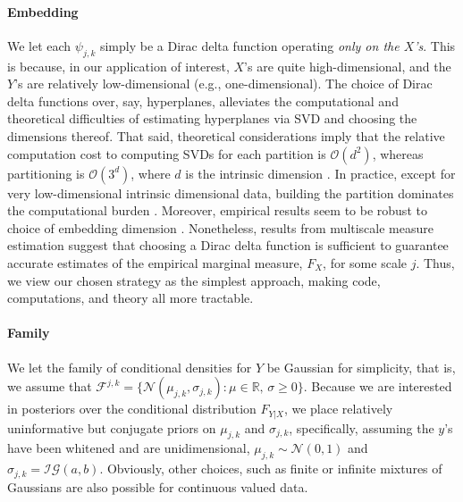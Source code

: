 \documentclass{article} %
\newcommand{\Real}{\mathbb{R}}
\providecommand{\mc}[1]{\mathcal{#1}}
\begin{document}
\paragraph{Embedding} We let each $\psi_{j,k}$ simply be a Dirac delta function operating \emph{only on the $X$'s}.  This is because, in our application of interest, $X$'s are quite high-dimensional, and the $Y$'s are relatively low-dimensional (e.g., one-dimensional).  The choice of Dirac delta functions over, say, hyperplanes, alleviates the computational and theoretical difficulties of estimating hyperplanes via SVD and choosing the dimensions thereof. That said,  theoretical considerations imply that the relative computation cost to computing SVDs for each partition is $\mc{O}(d^2)$, whereas partitioning  is  
$\mc{O}(3^d)$, where $d$ is the intrinsic dimension \cite{Allard2012}. In practice, except for very low-dimensional intrinsic dimensional data, building the partition dominates the computational burden \cite{Allard2012}.  Moreover, empirical results seem to be robust to choice of embedding dimension \cite{Lawlor2012}. Nonetheless, results from multiscale measure estimation \cite{ChenMaggioni12} suggest that choosing a Dirac delta function is sufficient to guarantee accurate estimates of the empirical marginal measure, $F_X$, for some scale $j$.  Thus, we view our chosen strategy as the simplest approach, making code, computations, and theory all more tractable.  


\paragraph{Family} We let the family of conditional densities for $Y$ be Gaussian for simplicity, that is, we assume that $\mc{F}^{j,k}=\{\mc{N}(\mu_{j,k}, {\sigma}_{j,k}) : \mu \in \Real, \, \sigma \geq 0\}$. Because we are interested in posteriors over the conditional distribution $F_{Y|X}$, we place relatively uninformative but conjugate priors on $\mu_{j,k}$ and ${\sigma}_{j,k}$, specifically, assuming the $y$'s have been whitened and are unidimensional,  
${\mu}_{j,k} \sim \mc{N}(0,1)$ and ${\sigma}_{j,k}=\mc{IG}(a,b)$.  
Obviously, other choices, such as finite or infinite mixtures of Gaussians are also possible for continuous valued data.  
\end{document}

